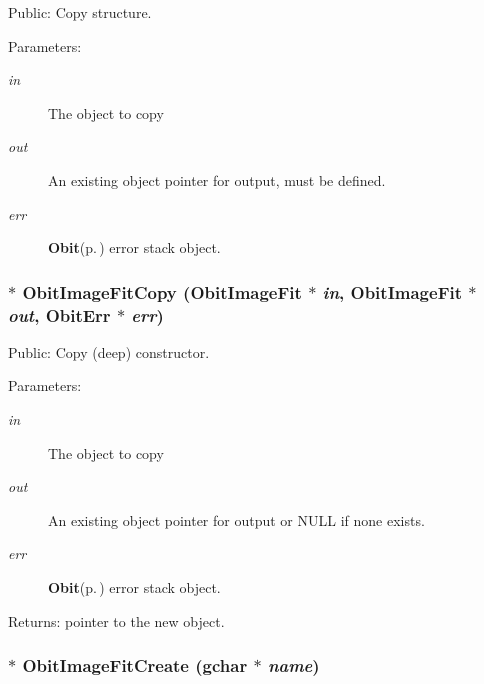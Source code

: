 Public: Copy structure. 

\begin{Desc}
\item[Parameters:]
\begin{description}
\item[{\em in}]The object to copy \item[{\em out}]An existing object pointer for output, must be defined. \item[{\em err}]{\bf Obit}{\rm (p.\,\pageref{structObit})} error stack object. \end{description}
\end{Desc}
\subsubsection{$\ast$ Obit\-Image\-Fit\-Copy ({\bf Obit\-Image\-Fit} $\ast$ {\em in}, {\bf Obit\-Image\-Fit} $\ast$ {\em out}, {\bf Obit\-Err} $\ast$ {\em err})}\label{ObitImageFit_8c_a10}


Public: Copy (deep) constructor. 

\begin{Desc}
\item[Parameters:]
\begin{description}
\item[{\em in}]The object to copy \item[{\em out}]An existing object pointer for output or NULL if none exists. \item[{\em err}]{\bf Obit}{\rm (p.\,\pageref{structObit})} error stack object. \end{description}
\end{Desc}
\begin{Desc}
\item[Returns:]pointer to the new object. \end{Desc}
\subsubsection{$\ast$ Obit\-Image\-Fit\-Create (gchar $\ast$ {\em name})}\label{ObitImageFit_8c_a12}


